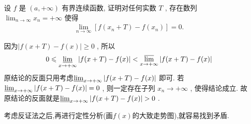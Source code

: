 \documentclass[../../main.tex]{subfiles}
\begin{document}
\begin{example}
设 \(f\) 是 \((a, +\infty)\) 有界连续函数, 证明对任何实数 \(T\) , 存在数列 \(\lim_{n \to \infty} x_n = +\infty\) 使得
\begin{align*}
\lim_{n \to \infty} [f(x_n + T) - f(x_n)] = 0.
\end{align*}
\end{example}
\begin{remark}
因为\(\vert f(x + T) - f(x)\vert \geqslant 0\) , 所以
\begin{align*}
0\leqslant \varliminf_{x \to +\infty} \vert f(x + T) - f(x)\vert < \varlimsup_{x \to +\infty} \vert f(x + T) - f(x)\vert
\end{align*}
原结论的反面只用考虑\(\varliminf_{x \to +\infty} \vert f(x + T) - f(x)\vert\) 即可. 若\(\varliminf_{x \to +\infty} \vert f(x + T) - f(x)\vert = 0\) , 则一定存在子列 \(x_n \to +\infty\) , 使得结论成立.
故原结论的反面就是\(\varliminf_{x \to +\infty} \vert f(x + T) - f(x)\vert > 0\) .
\end{remark}
\begin{note}
考虑反证法之后,再进行定性分析(画$f(x)$的大致走势图),就容易找到矛盾.
\end{note}
\end{document}
